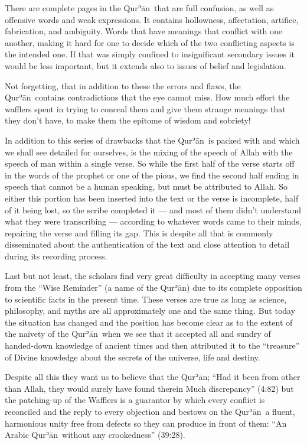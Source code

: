 \documentclass[12pt]{memoir}
\def\´{ʾ} %
\def \Quran{Qur\-\´ān} %
\def\–{-\hskip0pt}
\newcommand{\QRef}[1]{{\color{darkblue}#1}}
\begin{document}
There are complete pages in the \Quran\ that are full confusion,
as well as offensive words and weak expressions.
It contains hollowness, affectation, artifice, fabrication, and ambiguity.
Words that have meanings that conflict with one another,
making it hard for one to decide
which of the two conflicting aspects is the intended one.
If that was simply confined to insignificant secondary issues
it would be less important,
but it extends also to issues of belief and legislation.

Not forgetting, that in addition to these the errors and flaws,
the \Quran\ contains contradictions that the eye cannot miss.
How much effort the wafflers spent in trying to conceal them
and give them strange meanings that they don’t have,
to make them the epitome of wisdom and sobriety!

In addition to this series of drawbacks that the \Quran\ is packed with
and which we shall see detailed for ourselves,
is the mixing of the speech of Allah with
the speech of man within a single verse.
So while the first half of the verse starts off
in the words of the prophet or one of the pious,
we find the second half ending in speech that cannot be a human speaking,
but must be attributed to Allah.
So either this portion has been inserted
into the text or the verse is incomplete,
half of it being lost, so the scribe completed it —
and most of them didn’t understand what they were transcribing —
according to whatever words came to their minds,
repairing the verse and filling its gap.
This is despite all that is commonly disseminated
about the authentication of the text and close attention
to detail during its recording process.

Last but not least, the scholars find very great difficulty in
accepting many verses from the “Wise Reminder” (a name of the \Quran)
due to its complete opposition to scientific facts in the present time.
These verses are true as long as science, philosophy,
and myths are all approximately one and the same thing.
But today the situation has changed and the position has become clear
as to the extent of the naïvety of the \Quran\ when we see
that it accepted all and sundry of handed\–down knowledge of ancient times
and then attributed it to the “treasure” of Divine knowledge
about the secrets of the universe, life and destiny.

Despite all this they want us to believe that the \Quran;
“Had it been from other than Allah, they would surely
have found therein Much discrepancy” (\QRef{4:82})
but the patching\–up of the Wafflers is a guarantor by which every conflict
is reconciled and the reply to every objection
and bestows on the \Quran\ a fluent,
harmonious unity free from defects so they can produce in front of them:
“An Arabic \Quran\ without any crookedness” (\QRef{39:28}).
\end{document}
